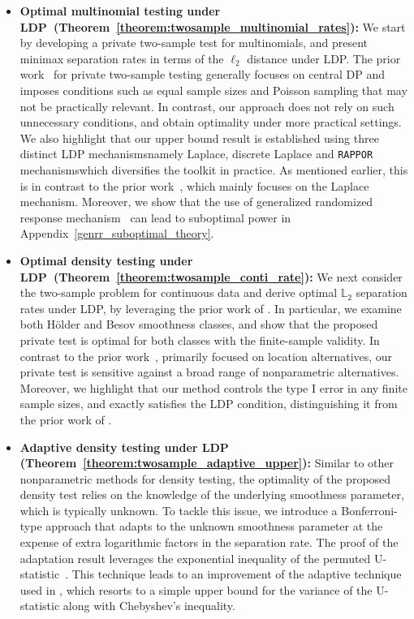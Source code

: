 \documentclass[twoside,11pt]{article}
\begin{document}
\begin{itemize}
	\item \textbf{Optimal multinomial testing under LDP~(Theorem~\ref{theorem:twosample_multinomial_rates}):} We start by developing a private two-sample test for multinomials, and present minimax separation rates in terms of the $\ell_2$ distance under LDP. The prior work~\cite{Acharya2018dPGofTwosample, Aliakbarpour2019PrivatePermutations,Aliakbarpour2018DPgof} for private two-sample testing generally focuses on central DP and imposes conditions such as equal sample sizes and Poisson sampling that may not be practically relevant. In contrast, our approach does not rely on such unnecessary conditions, and obtain optimality under more practical settings. We also highlight that our upper bound result is established using three distinct LDP mechanisms{\textemdash}namely Laplace, discrete Laplace and \texttt{RAPPOR} mechanisms{\textemdash}which diversifies the toolkit in practice. As mentioned earlier, this is in contrast to the prior work~\cite{Lam-Weil2021MinimaxConstraint,Dubois2022}, which mainly focuses on the Laplace mechanism. Moreover, we show that the use of generalized randomized response mechanism~\citep{Gaboardi2018LDPChisq} can lead to suboptimal power in Appendix~\ref{genrr_suboptimal_theory}. 
	\item \textbf{Optimal density testing under LDP~(Theorem~\ref{theorem:twosample_conti_rate}):} We next consider the two-sample problem for continuous data and derive optimal $\mathbb{L}_2$ separation rates under LDP, by leveraging the prior work of \cite{Lam-Weil2021MinimaxConstraint,kim_minimax_2022}. In particular, we examine both H\"{o}lder and Besov smoothness classes, and show that the proposed private test is optimal for both classes with the finite-sample validity. In contrast to the prior work~\citep{Ding2018TwosampleMean, Waudby-Smith2022LDPTwosample}, primarily focused on location alternatives, our private test is sensitive against a broad range of nonparametric alternatives. Moreover, we highlight that our method controls the type I error in any finite sample sizes, and exactly satisfies the LDP condition, distinguishing it from the prior work of \cite{Raj2020ATest}.
	\item \textbf{Adaptive density testing under LDP (Theorem~\ref{theorem:twosample_adaptive_upper}):} Similar to other nonparametric methods for density testing, the optimality of the proposed density test relies on the knowledge of the underlying smoothness parameter, which is typically unknown. To tackle this issue, we introduce a Bonferroni-type approach that adapts to the unknown smoothness parameter at the expense of extra logarithmic factors in the separation rate. The proof of the adaptation result leverages the exponential inequality of the permuted U-statistic~\citep{kim_minimax_2022}. This technique leads to an improvement of the adaptive technique used in \citet{Lam-Weil2021MinimaxConstraint}, which resorts to a simple upper bound for the variance of the U-statistic along with Chebyshev's inequality.
	

\end{itemize}
\end{document}
